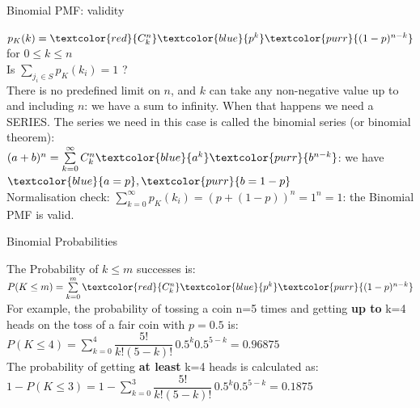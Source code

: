 \documentclass[10pt,sans,english,compress,xcolor=dvipsnames]{beamer}
\begin{document}
\begin{frame}{Binomial PMF: validity}

\small

$p_K(k) = \textcolor{red}{C_k^n} \textcolor{blue}{p^k}\textcolor{purr}{ (1-p)^{n-k}}$ for $0\leq k \leq n$\\[1ex]

Is $\sum\limits_{j_i \in S} p_K(k_i) =1$ ?\\[1ex]


There is no predefined limit on $n$, and $k$ can take any non-negative value up to  and including $n$: we have a sum to infinity. When that happens we need a SERIES. The series we need in this case is called the binomial series (or binomial theorem):\\[1ex]

$(a+b)^n = \sum\limits_{k=0}^{\infty} C_k^n \textcolor{blue}{a^k} \textcolor{purr}{b^{n-k}}$: we have $\textcolor{blue}{a=p}, \textcolor{purr}{b=1-p}$\\[1ex]


Normalisation check: $ \sum\limits_{k=0}^{\infty}  p_K(k_i) = (p+(1-p))^n =1^n = 1$: the Binomial PMF is valid.

\end{frame} 


\begin{frame}{Binomial Probabilities}

The Probability of $k \leq m$ successes is:\\[1ex]

 $P(K\leq m) = \sum\limits_{k=0}^{m} \textcolor{red}{C_k^n} \textcolor{blue}{p^k}\textcolor{purr}{ (1-p)^{n-k}}$ \\[1ex]
 
 \small
For example, the probability of tossing a coin n=5 times and getting \textbf{up to} k=4 heads on the toss of a fair coin with $p=0.5$ is:\\[1ex]
 
$P(K\leq 4) = \sum\limits_{k=0}^{4} \dfrac{ 5!}{ k!(5-k)!}\, 0.5^k 0.5^{5-k} = 0.96875$\\[1ex]

The probability of getting \textbf{at least} k=4 heads is calculated as:\\[1ex]

$1 - P(K\leq 3) =1 - \sum\limits_{k=0}^{3} \dfrac{ 5!}{ k!(5-k)!}\, 0.5^k 0.5^{5-k} = 0.1875$\\[1ex]
 
 

\end{frame} 
\end{document}
